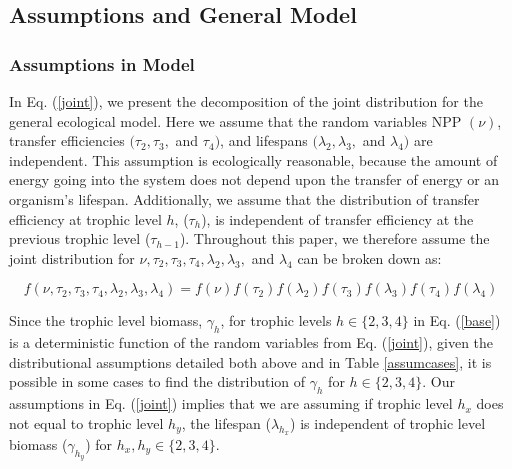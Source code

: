 \documentclass[oneside,12pt,final]{sty/ucthesis-CA2012}
\begin{document}
\begin{mainmatter}
\subsection*{Assumptions and General Model}
\subsubsection*{Assumptions in Model}
In Eq. (\ref{joint}), we present the decomposition of the joint distribution for the general ecological model. Here we assume that the random variables NPP $(\nu)$, transfer efficiencies $(\tau_2, \tau_3,$ and $\tau_4)$, and lifespans $(\lambda_2, \lambda_3,$ and $\lambda_4)$ are independent. This assumption is ecologically reasonable, because the amount of energy going into the system does not depend upon the transfer of energy or an organism's lifespan. Additionally, we assume that the distribution of transfer efficiency at trophic level $h$, ($\tau_h$), is independent of transfer efficiency at the previous trophic level ($\tau_{h-1}$). Throughout this paper, we therefore assume the joint distribution for $\nu, \tau_2, \tau_3, \tau_4, \lambda_2, \lambda_3,$ and $\lambda_4$ can be broken down as:

\begin{equation} \label{joint}
f(\nu, \tau_2, \tau_3, \tau_4, \lambda_2, \lambda_3, \lambda_4) =  f(\nu)f(\tau_2)f(\lambda_2)f(\tau_3)f(\lambda_3)f(\tau_4)f(\lambda_4)  
\end{equation}

Since the trophic level biomass, $\gamma_h$, for trophic levels $h \in \{ 2,3,4\}$ in Eq. (\ref{base}) is a deterministic function of the random variables from Eq. (\ref{joint}), given the distributional assumptions detailed both above and in Table \ref{assumcases}, it is possible  in some cases to find the distribution of $\gamma_h$ for $h \in \{2, 3, 4\}$. Our assumptions in Eq. (\ref{joint}) implies that we are assuming if trophic level $h_x$ does not equal to trophic level $h_y$, the lifespan ($\lambda_{h_{x}}$) is independent of trophic level biomass ($\gamma_{h_{y}}$) for $h_x, h_y \in \{2, 3, 4\}$.


\end{mainmatter}
\end{document}
